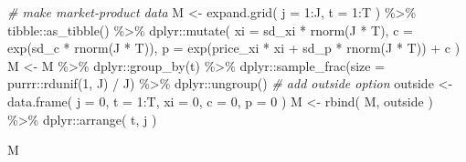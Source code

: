 \documentclass[
]{book}
\newenvironment{Shaded}{\begin{snugshade}}{\end{snugshade}}
\newcommand{\AttributeTok}[1]{\textcolor[rgb]{0.77,0.63,0.00}{#1}}
\newcommand{\CommentTok}[1]{\textcolor[rgb]{0.56,0.35,0.01}{\textit{#1}}}
\newcommand{\DecValTok}[1]{\textcolor[rgb]{0.00,0.00,0.81}{#1}}
\newcommand{\FunctionTok}[1]{\textcolor[rgb]{0.00,0.00,0.00}{#1}}
\newcommand{\NormalTok}[1]{#1}
\newcommand{\OtherTok}[1]{\textcolor[rgb]{0.56,0.35,0.01}{#1}}
\newcommand{\SpecialCharTok}[1]{\textcolor[rgb]{0.00,0.00,0.00}{#1}}
\begin{document}
\begin{Shaded}
\begin{Highlighting}[]
\CommentTok{\# make market{-}product data}
\NormalTok{M }\OtherTok{\textless{}{-}} 
  \FunctionTok{expand.grid}\NormalTok{(}
    \AttributeTok{j =} \DecValTok{1}\SpecialCharTok{:}\NormalTok{J, }
    \AttributeTok{t =} \DecValTok{1}\SpecialCharTok{:}\NormalTok{T}
\NormalTok{    ) }\SpecialCharTok{\%\textgreater{}\%}
\NormalTok{    tibble}\SpecialCharTok{::}\FunctionTok{as\_tibble}\NormalTok{() }\SpecialCharTok{\%\textgreater{}\%}
\NormalTok{    dplyr}\SpecialCharTok{::}\FunctionTok{mutate}\NormalTok{(}
      \AttributeTok{xi =}\NormalTok{ sd\_xi }\SpecialCharTok{*} \FunctionTok{rnorm}\NormalTok{(J }\SpecialCharTok{*}\NormalTok{ T),}
      \AttributeTok{c =} \FunctionTok{exp}\NormalTok{(sd\_c }\SpecialCharTok{*} \FunctionTok{rnorm}\NormalTok{(J }\SpecialCharTok{*}\NormalTok{ T)),}
      \AttributeTok{p =} \FunctionTok{exp}\NormalTok{(price\_xi }\SpecialCharTok{*}\NormalTok{ xi }\SpecialCharTok{+}\NormalTok{ sd\_p }\SpecialCharTok{*} \FunctionTok{rnorm}\NormalTok{(J }\SpecialCharTok{*}\NormalTok{ T)) }\SpecialCharTok{+}\NormalTok{ c}
\NormalTok{    ) }
\NormalTok{M }\OtherTok{\textless{}{-}} 
\NormalTok{  M }\SpecialCharTok{\%\textgreater{}\%}
\NormalTok{  dplyr}\SpecialCharTok{::}\FunctionTok{group\_by}\NormalTok{(t) }\SpecialCharTok{\%\textgreater{}\%}
\NormalTok{  dplyr}\SpecialCharTok{::}\FunctionTok{sample\_frac}\NormalTok{(}\AttributeTok{size =}\NormalTok{ purrr}\SpecialCharTok{::}\FunctionTok{rdunif}\NormalTok{(}\DecValTok{1}\NormalTok{, J) }\SpecialCharTok{/}\NormalTok{ J) }\SpecialCharTok{\%\textgreater{}\%}
\NormalTok{  dplyr}\SpecialCharTok{::}\FunctionTok{ungroup}\NormalTok{()}
\CommentTok{\# add outside option}
\NormalTok{outside }\OtherTok{\textless{}{-}} 
  \FunctionTok{data.frame}\NormalTok{(}
    \AttributeTok{j =} \DecValTok{0}\NormalTok{, }
    \AttributeTok{t =} \DecValTok{1}\SpecialCharTok{:}\NormalTok{T, }
    \AttributeTok{xi =} \DecValTok{0}\NormalTok{, }
    \AttributeTok{c =} \DecValTok{0}\NormalTok{, }
    \AttributeTok{p =} \DecValTok{0}
\NormalTok{    )}
\NormalTok{M }\OtherTok{\textless{}{-}} 
  \FunctionTok{rbind}\NormalTok{(}
\NormalTok{    M,}
\NormalTok{    outside}
\NormalTok{    ) }\SpecialCharTok{\%\textgreater{}\%}
\NormalTok{  dplyr}\SpecialCharTok{::}\FunctionTok{arrange}\NormalTok{(}
\NormalTok{    t, }
\NormalTok{    j}
\NormalTok{    )}
\end{Highlighting}
\end{Shaded}

\begin{Shaded}
\begin{Highlighting}[]
\NormalTok{M}
\end{Highlighting}
\end{Shaded}
\end{document}
